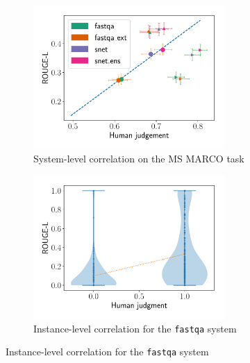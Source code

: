 \begin{figure}[!p]
  \begin{subfigure}{\textwidth}
    \includegraphics[width=0.8\textwidth]{figures/msmarco_bias}
    \caption{\label{fig:bias-msmarco-system} System-level correlation on the MS MARCO task}
  \end{subfigure}

  \begin{subfigure}{\textwidth}
    \includegraphics[width=0.8\textwidth]{figures/msmarco_instance_correlation}
    \caption{\label{fig:bias-msmarco-instance} Instance-level correlation for the \texttt{fastqa} system}
  \end{subfigure}


\end{figure}

